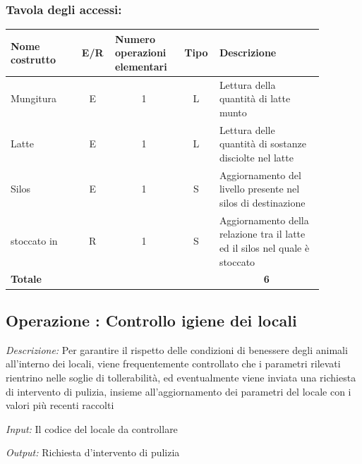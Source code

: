 \documentclass[12pt,a4paper]{article}
\begin{document}
\subsubsection*{Tavola degli accessi:}

\begin{center}\setlength{\extrarowheight}{1.5pt}\begin{longtable}{|p{0.2\linewidth}|p{0.1\linewidth}|p{0.175\linewidth}|p{0.1\linewidth}|p{0.3\linewidth}|}\hline \textbf{Nome costrutto}   & \multicolumn{1}{|c|}{\textbf{E/R}} & \textbf{Numero operazioni elementari} & \multicolumn{1}{|c|}{\textbf{Tipo}} & \textbf{Descrizione}\\ 
\hline
Mungitura
 & 
\multicolumn{1}{|c|}{E}
 & 
\multicolumn{1}{|c|}{1}
 & 
\multicolumn{1}{|c|}{L}
 & 
Lettura della quantità di latte munto
\\
\hline
Latte
 & 
\multicolumn{1}{|c|}{E}
 & 
\multicolumn{1}{|c|}{1}
 & 
\multicolumn{1}{|c|}{L}
 & 
Lettura delle quantità di sostanze disciolte nel latte
\\
\hline
Silos
 & 
\multicolumn{1}{|c|}{E}
 & 
\multicolumn{1}{|c|}{1}
 & 
\multicolumn{1}{|c|}{S}
 & 
Aggiornamento del livello presente nel silos di destinazione
\\
\hline
stoccato in
 & 
\multicolumn{1}{|c|}{R}
 & 
\multicolumn{1}{|c|}{1}
 & 
\multicolumn{1}{|c|}{S}
 & 
Aggiornamento della relazione tra il latte ed il silos nel quale è stoccato
\\
\hline
\multicolumn{4}{|l|}{\textbf{Totale}}
 & 
\multicolumn{1}{|c|}{\textbf{6}}
\\
\hline
\end{longtable}\end{center}

\subsection*{Operazione \thecounterAccessi{}: Controllo igiene dei locali}
\noindent\textit{Descrizione:} Per garantire il rispetto delle condizioni di benessere degli animali all'interno dei locali, viene frequentemente controllato che i parametri rilevati rientrino nelle soglie di tollerabilità, ed eventualmente viene inviata una richiesta di intervento di pulizia, insieme all'aggiornamento dei parametri del locale con i valori più recenti raccolti

\noindent\textit{Input:} Il codice del locale da controllare

\noindent\textit{Output:} Richiesta d'intervento di pulizia
\end{document}
